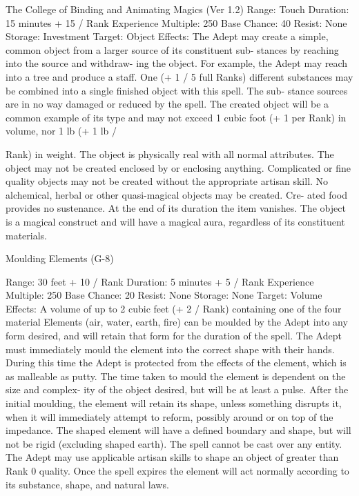 \begin{Chapter}{The College of Binding and Animating Magics (Ver 1.2)}
Range: Touch 
Duration: 15 minutes + 15 / Rank 
Experience Multiple: 250 
Base Chance: 40%
Resist: None 
Storage: Investment 
Target: Object 
Effects:  The  Adept  may  create  a  simple,  common 
object  from  a  larger  source  of  its  constituent  sub-
stances  by  reaching  into the  source  and  withdraw-
ing  the  object.  For  example,  the  Adept  may  reach 
into  a  tree  and  produce  a  staff.  One  (+  1  /  5  full 
Ranks) different substances may be combined into 
a  single  finished  object  with  this  spell.  The  sub-
stance  sources  are  in  no  way  damaged  or  reduced 
by the spell.  The created object will  be a common 
example  of  its  type  and  may  not  exceed  1  cubic 
foot  (+  1  per  Rank)  in  volume,  nor  1  lb  (+  1  lb  / 

Rank) in weight. The object is physically real with 
all normal attributes. The object may not be created 
enclosed by or enclosing anything. Complicated or 
fine quality objects may not be created without the 
appropriate  artisan  skill.  No  alchemical,  herbal  or 
other  quasi-magical  objects  may  be  created.  Cre-
ated food provides no sustenance. At the end of its 
duration the item vanishes. The object is a magical 
construct  and  will  have  a  magical  aura,  regardless 
of its constituent materials. 

Moulding Elements (G-8) 

Range: 30 feet + 10 / Rank 
Duration: 5 minutes + 5 / Rank 
Experience Multiple: 250 
Base Chance: 20%
Resist: None 
Storage: None 
Target: Volume 
Effects:  A  volume  of  up  to  2  cubic  feet  (+  2  / 
Rank) containing one of the four material Elements 
(air,  water,  earth,  fire)  can  be  moulded  by  the 
Adept  into  any  form  desired,  and  will  retain  that 
form for the duration of the spell. The Adept must 
immediately  mould  the  element  into  the  correct 
shape with their hands. During this time the Adept 
is protected from the effects of the element, which 
is  as  malleable  as  putty.  The  time  taken  to  mould 
the element is dependent on the size and complex-
ity of the object desired, but will be at least a pulse. 
After  the  initial  moulding,  the  element  will  retain 
its shape, unless something disrupts it, when it will 
immediately attempt to reform, possibly around  or 
on  top  of  the impedance.  The  shaped  element  will 
have a defined boundary and shape, but will not be 
rigid (excluding shaped earth). The spell cannot be 
cast over any entity. The Adept may use applicable 
artisan  skills  to  shape  an  object  of  greater  than 
Rank 0 quality. Once the spell expires the element 
will act normally according to its substance, shape, 
and natural laws. 


\end{Chapter}
